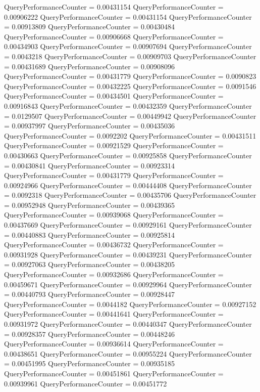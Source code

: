 \documentclass[9pt]{article}
\theoremstyle{plain}
\theoremstyle{definition}
\theoremstyle{remark}
\numberwithin{equation}{section}
\begin{document}
QueryPerformanceCounter  =  0.00431154
QueryPerformanceCounter  =  0.00906222
QueryPerformanceCounter  =  0.00431154
QueryPerformanceCounter  =  0.00913809
QueryPerformanceCounter  =  0.00430484
QueryPerformanceCounter  =  0.00906668
QueryPerformanceCounter  =  0.00434903
QueryPerformanceCounter  =  0.00907694
QueryPerformanceCounter  =  0.0043218
QueryPerformanceCounter  =  0.00909703
QueryPerformanceCounter  =  0.00431689
QueryPerformanceCounter  =  0.00908096
QueryPerformanceCounter  =  0.00431779
QueryPerformanceCounter  =  0.0090823
QueryPerformanceCounter  =  0.00432225
QueryPerformanceCounter  =  0.0091546
QueryPerformanceCounter  =  0.00434501
QueryPerformanceCounter  =  0.00916843
QueryPerformanceCounter  =  0.00432359
QueryPerformanceCounter  =  0.0129507
QueryPerformanceCounter  =  0.00449942
QueryPerformanceCounter  =  0.00937997
QueryPerformanceCounter  =  0.00435036
QueryPerformanceCounter  =  0.0092202
QueryPerformanceCounter  =  0.00431511
QueryPerformanceCounter  =  0.00921529
QueryPerformanceCounter  =  0.00430663
QueryPerformanceCounter  =  0.00925858
QueryPerformanceCounter  =  0.00430841
QueryPerformanceCounter  =  0.00923314
QueryPerformanceCounter  =  0.00431779
QueryPerformanceCounter  =  0.00924966
QueryPerformanceCounter  =  0.00444408
QueryPerformanceCounter  =  0.0092318
QueryPerformanceCounter  =  0.00435706
QueryPerformanceCounter  =  0.00952948
QueryPerformanceCounter  =  0.00439365
QueryPerformanceCounter  =  0.00939068
QueryPerformanceCounter  =  0.00437669
QueryPerformanceCounter  =  0.00929161
QueryPerformanceCounter  =  0.00440883
QueryPerformanceCounter  =  0.00925814
QueryPerformanceCounter  =  0.00436732
QueryPerformanceCounter  =  0.00931928
QueryPerformanceCounter  =  0.00439231
QueryPerformanceCounter  =  0.00927063
QueryPerformanceCounter  =  0.00438205
QueryPerformanceCounter  =  0.00932686
QueryPerformanceCounter  =  0.00459671
QueryPerformanceCounter  =  0.00929964
QueryPerformanceCounter  =  0.00440793
QueryPerformanceCounter  =  0.00928447
QueryPerformanceCounter  =  0.0044182
QueryPerformanceCounter  =  0.00927152
QueryPerformanceCounter  =  0.00441641
QueryPerformanceCounter  =  0.00931972
QueryPerformanceCounter  =  0.00440347
QueryPerformanceCounter  =  0.00928357
QueryPerformanceCounter  =  0.00448246
QueryPerformanceCounter  =  0.00936614
QueryPerformanceCounter  =  0.00438651
QueryPerformanceCounter  =  0.00955224
QueryPerformanceCounter  =  0.00451995
QueryPerformanceCounter  =  0.00935185
QueryPerformanceCounter  =  0.00451861
QueryPerformanceCounter  =  0.00939961
QueryPerformanceCounter  =  0.00451772
\end{document}
